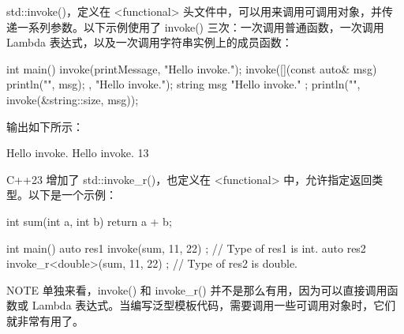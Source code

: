 
std::invoke()，定义在 <functional> 头文件中，可以用来调用可调用对象，并传递一系列参数。以下示例使用了 invoke() 三次：一次调用普通函数，一次调用 Lambda 表达式，以及一次调用字符串实例上的成员函数：

\begin{cpp}
int main()
{
    invoke(printMessage, "Hello invoke.");
    invoke([](const auto& msg) { println("{}", msg); }, "Hello invoke.");
    string msg { "Hello invoke." };
    println("{}", invoke(&string::size, msg));
}
\end{cpp}

输出如下所示：

\begin{shell}
Hello invoke.
Hello invoke.
13
\end{shell}


C++23 增加了 std::invoke\_r()，也定义在 <functional> 中，允许指定返回类型。以下是一个示例：

\begin{cpp}
int sum(int a, int b) { return a + b; }

int main()
{
    auto res1 { invoke(sum, 11, 22) }; // Type of res1 is int.
    auto res2 { invoke_r<double>(sum, 11, 22) }; // Type of res2 is double.
}
\end{cpp}

\begin{myNotic}{NOTE}
单独来看，invoke() 和 invoke\_r() 并不是那么有用，因为可以直接调用函数或 Lambda 表达式。当编写泛型模板代码，需要调用一些可调用对象时，它们就非常有用了。
\end{myNotic}






